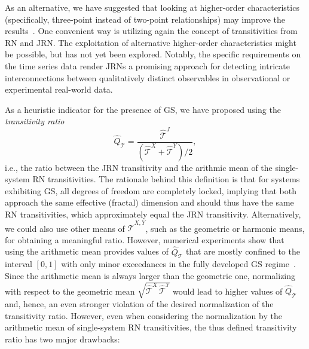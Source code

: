 \documentclass[graybox]{svmult}
\begin{document}
As an alternative, we have suggested that looking at higher-order characteristics (specifically, three-point instead of two-point relationships) may improve the results~\cite{Feldhoff2013}. %
One convenient way is utilizing again the concept of transitivities from RN and JRN. The exploitation of alternative higher-order characteristics might be possible, but has not yet been explored.
Notably, the specific requirements on the time series data render JRNs a promising approach for detecting intricate interconnections between qualitatively distinct observables in observational or experimental real-world data. 

As a heuristic indicator for the presence of GS, we have proposed using the \emph{transitivity ratio}~\cite{Feldhoff2013} 
\begin{equation}
\hat{Q}_{\mathcal{T}}=\frac{\hat{\mathcal{T}}^J}{(\hat{\mathcal{T}}^X+\hat{\mathcal{T}}^Y)/2}, 
\label{eq:qt}
\end{equation}
\noindent
i.e., the ratio between the JRN transitivity and the arithmic mean of the single-system RN transitivities. The rationale behind this definition is that for systems exhibiting GS, all degrees of freedom are completely locked, implying that both approach the same effective (fractal) dimension and should thus have the same RN transitivities, which approximately equal the JRN transitivity. Alternatively, we could also use other means of $\hat{\mathcal{T}}^{X,Y}$, such as the geometric or harmonic means, for obtaining a meaningful ratio. However, numerical experiments show that using the arithmetic mean provides values of $\hat{Q}_{\mathcal{T}}$ that are mostly confined to the interval $[0,1]$ with only minor exceedances in the fully developed GS regime~\cite{Feldhoff2013}. Since the arithmetic mean is always larger than the geometric one, normalizing with respect to the geometric mean $\sqrt{\hat{\mathcal{T}}^X\, \hat{\mathcal{T}}^Y}$ would lead to higher values of $\hat{Q}_{\mathcal{T}}$ and, hence, an even stronger violation of the desired normalization of the transitivity ratio. However, even when considering the normalization by the arithmetic mean of single-system RN transitivities, the thus defined transitivity ratio has two major drawbacks: 
\end{document}
